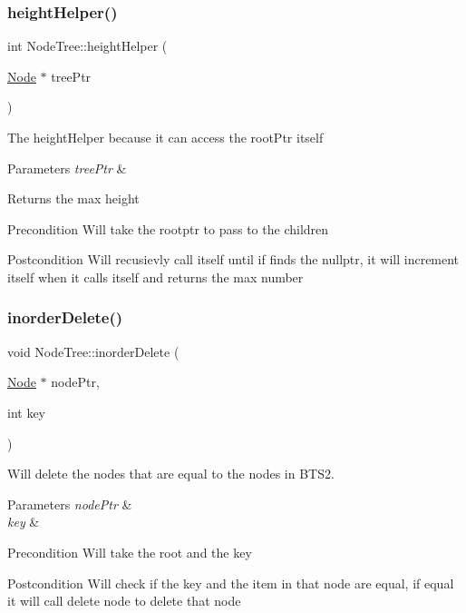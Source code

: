 \subsubsection{\texorpdfstring{height\+Helper()}{heightHelper()}}
{\footnotesize\ttfamily int Node\+Tree\+::height\+Helper (\begin{DoxyParamCaption}\item[{\mbox{\hyperlink{class_node}{Node}} $\ast$}]{tree\+Ptr }\end{DoxyParamCaption})}

The height\+Helper because it can access the root\+Ptr itself 
\begin{DoxyParams}{Parameters}
{\em tree\+Ptr} & \\
\hline
\end{DoxyParams}
\begin{DoxyReturn}{Returns}
the max height 
\end{DoxyReturn}
\begin{DoxyPrecond}{Precondition}
Will take the rootptr to pass to the children 
\end{DoxyPrecond}
\begin{DoxyPostcond}{Postcondition}
Will recusievly call itself until if finds the nullptr, it will increment itself when it calls itself and returns the max number 
\end{DoxyPostcond}
\mbox{\label{class_node_tree_ac57c84edf2b16c3fed7085413b272a62}} 
\subsubsection{\texorpdfstring{inorder\+Delete()}{inorderDelete()}}
{\footnotesize\ttfamily void Node\+Tree\+::inorder\+Delete (\begin{DoxyParamCaption}\item[{\mbox{\hyperlink{class_node}{Node}} $\ast$}]{node\+Ptr,  }\item[{int}]{key }\end{DoxyParamCaption})}



Will delete the nodes that are equal to the nodes in B\+T\+S2. 


\begin{DoxyParams}{Parameters}
{\em node\+Ptr} & \\
\hline
{\em key} & \\
\hline
\end{DoxyParams}
\begin{DoxyPrecond}{Precondition}
Will take the root and the key 
\end{DoxyPrecond}
\begin{DoxyPostcond}{Postcondition}
Will check if the key and the item in that node are equal, if equal it will call delete node to delete that node 
\end{DoxyPostcond}
\mbox{\label{class_node_tree_a3973627c8a390da9b12e4bc9d4a9327d}} 
